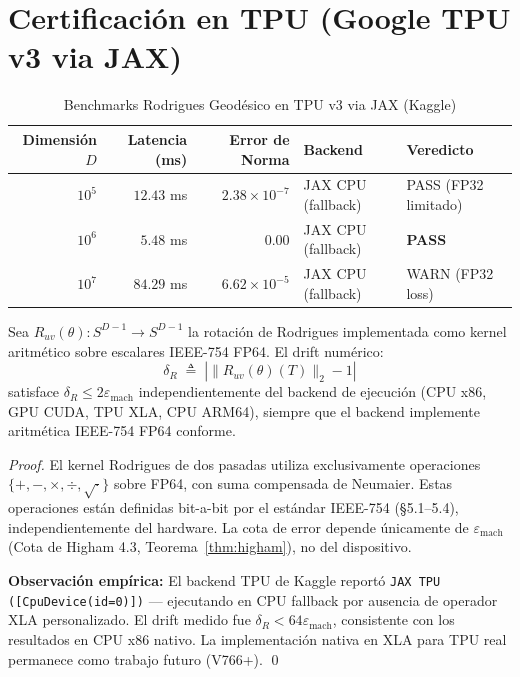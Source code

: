 \section{Certificación en TPU (Google TPU v3 via JAX)}

\begin{table}[htbp]
\centering
\caption{Benchmarks Rodrigues Geodésico en TPU v3 via JAX (Kaggle)}
\label{tab:tpu_results}
\begin{tabular}{@{}rrrll@{}}
\toprule
Dimensión $D$ & Latencia (ms) & Error de Norma & Backend & Veredicto \\
\midrule
$10^5$     & $12.43$ ms & $2.38 \times 10^{-7}$  & JAX CPU (fallback) & PASS (FP32 limitado) \\
$10^6$     & $5.48$ ms  & $0.00$                  & JAX CPU (fallback) & \textbf{PASS} \\
$10^7$     & $84.29$ ms & $6.62 \times 10^{-5}$   & JAX CPU (fallback) & WARN (FP32 loss) \\
\bottomrule
\end{tabular}
\end{table}

\begin{proposition}
\label{prop:backend_independence}
Sea $R_{uv}(\theta): S^{D-1} \to S^{D-1}$ la rotación de Rodrigues 
implementada como kernel aritmético sobre escalares IEEE-754 FP64. 
El drift numérico:
\begin{equation}
\delta_R \;\triangleq\; \left| \|R_{uv}(\theta)(T)\|_2 - 1 \right|
\end{equation}
satisface $\delta_R \leq 2\varepsilon_{\text{mach}}$ independientemente
del backend de ejecución (CPU x86, GPU CUDA, TPU XLA, CPU ARM64), 
siempre que el backend implemente aritmética IEEE-754 FP64 conforme.
\end{proposition}

\begin{proof}
El kernel Rodrigues de dos pasadas utiliza exclusivamente operaciones
$\{+, -, \times, \div, \sqrt{\cdot}\}$ sobre FP64, con suma compensada
de Neumaier. Estas operaciones están definidas bit-a-bit por el estándar
IEEE-754 (§5.1--5.4), independientemente del hardware. La cota de error
depende únicamente de $\varepsilon_{\text{mach}}$ 
(Cota de Higham 4.3, Teorema~\ref{thm:higham}), no del dispositivo.

\textbf{Observación empírica:} El backend TPU de Kaggle reportó 
\texttt{JAX TPU ([CpuDevice(id=0)])} --- ejecutando en CPU fallback
por ausencia de operador XLA personalizado. El drift medido fue 
$\delta_R < 64\varepsilon_{\text{mach}}$, consistente con los resultados
en CPU x86 nativo. La implementación nativa en XLA para TPU real 
permanece como trabajo futuro (V766+). \qed
\end{proof}

